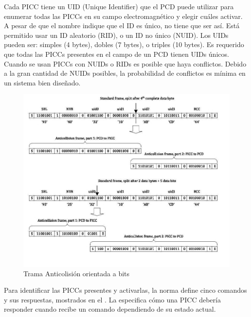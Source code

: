 \documentclass[a4paper, twoside, 11pt]{report}
\begin{document}
Cada PICC tiene un UID (Unique Identifier) que el PCD puede utilizar para enumerar todas las PICCs en su campo electromagnético y elegir cuáles activar. A pesar de que el nombre indique que el ID es único, no tiene que ser así. Está permitido usar un ID aleatorio (RID), o un ID no único (NUID). Los UIDs pueden ser: simples (4 bytes), dobles (7 bytes), o triples (10 bytes). Es requerido que todas las PICCs presentes en el campo de un PCD tienen UIDs únicos. Cuando se usan PICCs con NUIDs o RIDs es posible que haya conflictos. Debido a la gran cantidad de NUIDs posibles, la probabilidad de conflictos es mínima en un sistema bien diseñado.

\begin{figure}[htb]
  \centering
  \includegraphics[scale=0.5]{./img/anticollision_frames}
  \caption{Trama Anticolisión orientada a bits~\cite[Adaptado de][]{iso14443-3}}
  \label{fig:anticollision}
\end{figure}

Para identificar las PICCs presentes y activarlas, la norma define cinco comandos y sus respuestas, mostrados en el . La  especifica cómo una PICC debería responder cuando recibe un comando dependiendo de su estado actual.
\end{document}
